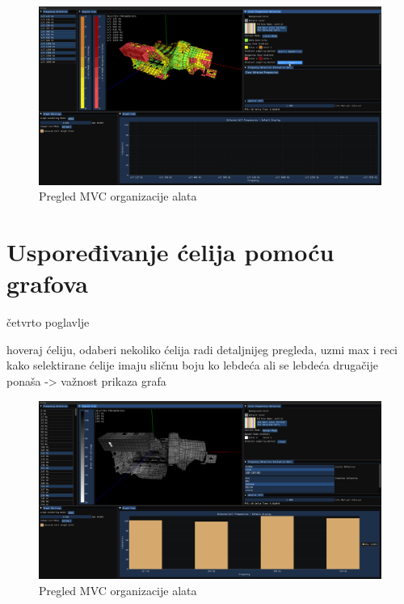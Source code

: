 \documentclass[times, utf8, diplomski]{fer}
\begin{document}
\begin{figure} [H]
	\centering
    \includegraphics[width=\textwidth]{demonstration/limits_mode_qrt.png}
    \caption{Pregled MVC organizacije alata}
    \label{fig:high-level-overview}
\end{figure}

\section{Uspoređivanje ćelija pomoću grafova}
četvrto poglavlje

hoveraj ćeliju, odaberi nekoliko ćelija radi detaljnijeg pregleda, uzmi max i reci kako selektirane ćelije imaju sličnu boju ko lebdeća ali se lebdeća drugačije ponaša -> važnost prikaza grafa

\begin{figure} [H]
	\centering
    \includegraphics[width=\textwidth]{demonstration/cell_hovered.png}
    \caption{Pregled MVC organizacije alata}
    \label{fig:high-level-overview}
\end{figure}
\end{document}
